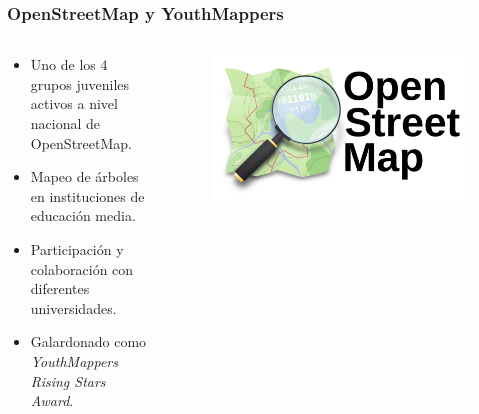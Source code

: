 \documentclass[17pt, t, lualatex]{beamer}
\begin{document}
\begin{frame}
  \frametitle{OpenStreetMap y YouthMappers}
  \begin{columns}
    \begin{column}{.5\textwidth}
      \begin{itemize}
        \item Uno de los 4 grupos juveniles activos a nivel nacional de OpenStreetMap.
        \item Mapeo de árboles en instituciones de educación media.
        \item Participación y colaboración con diferentes universidades.
        \item Galardonado como \textit{YouthMappers Rising Stars Award}.
      \end{itemize}
    \end{column}

    \begin{column}{.5\textwidth}
      \begin{figure}
        \centering
        \includegraphics[width=\textwidth]{img/OSM.png}
      \end{figure}
    \end{column}
  \end{columns}
\end{frame}
\end{document}
